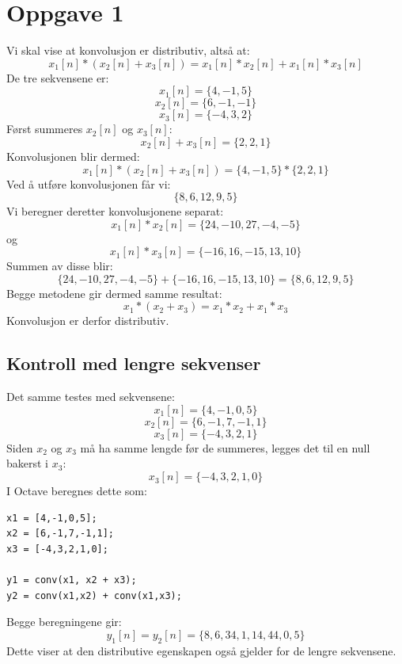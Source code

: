 
\hypertarget{oppgave1}{}
\section*{Oppgave 1}
Vi skal vise at konvolusjon er distributiv, altså at:
\[
x_1[n]*(x_2[n]+x_3[n])
=
x_1[n]*x_2[n]+x_1[n]*x_3[n]
\]
De tre sekvensene er:
\[
x_1[n]=\{4,-1,5\}
\]
\[
x_2[n]=\{6,-1,-1\}
\]
\[
x_3[n]=\{-4,3,2\}
\]
Først summeres $x_2[n]$ og $x_3[n]$:
\[
x_2[n]+x_3[n]
=
\{2,2,1\}
\]
Konvolusjonen blir dermed:
\[
x_1[n]*(x_2[n]+x_3[n])
=
\{4,-1,5\}*\{2,2,1\}
\]
Ved å utføre konvolusjonen får vi:
\[
\{8,6,12,9,5\}
\]
Vi beregner deretter konvolusjonene separat:
\[
x_1[n]*x_2[n]
=
\{24,-10,27,-4,-5\}
\]
og
\[
x_1[n]*x_3[n]
=
\{-16,16,-15,13,10\}
\]
Summen av disse blir:
\[
\{24,-10,27,-4,-5\}
+
\{-16,16,-15,13,10\}
=
\{8,6,12,9,5\}
\]
Begge metodene gir dermed samme resultat:
\[
\boxed{
x_1*(x_2+x_3)
=
x_1*x_2+x_1*x_3
}
\]
Konvolusjon er derfor distributiv.
\subsection*{Kontroll med lengre sekvenser}
Det samme testes med sekvensene:
\[
x_1[n]=\{4,-1,0,5\}
\]
\[
x_2[n]=\{6,-1,7,-1,1\}
\]
\[
x_3[n]=\{-4,3,2,1\}
\]
Siden $x_2$ og $x_3$ må ha samme lengde før de summeres, legges
det til en null bakerst i $x_3$:
\[
x_3[n]=\{-4,3,2,1,0\}
\]
I Octave beregnes dette som:
\begin{verbatim}
x1 = [4,-1,0,5];
x2 = [6,-1,7,-1,1];
x3 = [-4,3,2,1,0];

y1 = conv(x1, x2 + x3);
y2 = conv(x1,x2) + conv(x1,x3);
\end{verbatim}
Begge beregningene gir:
\[
y_1[n]
=
y_2[n]
=
\{8,6,34,1,14,44,0,5\}
\]
Dette viser at den distributive egenskapen også gjelder for de
lengre sekvensene.

